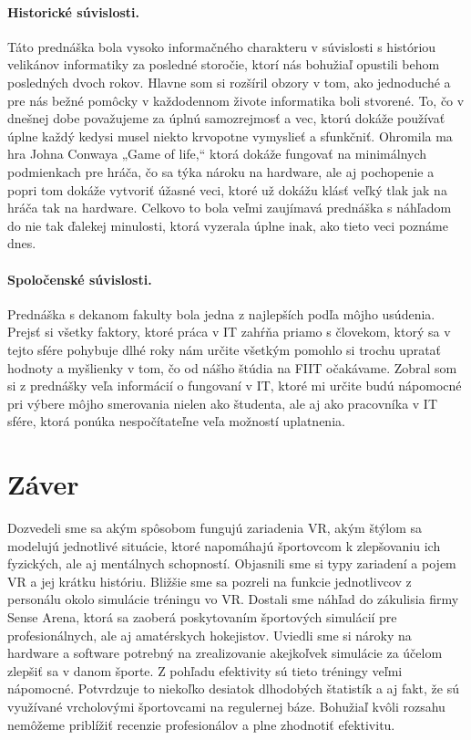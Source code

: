 \documentclass[10pt,twoside,slovak,a4paper]{article}										%
\begin{document}
\paragraph{Historické súvislosti.} 
Táto prednáška bola vysoko informačného charakteru v súvislosti s históriou velikánov informatiky za posledné storočie, ktorí nás bohužiaľ opustili behom posledných dvoch rokov. Hlavne som si rozšíril obzory v tom, ako jednoduché a pre nás bežné pomôcky v každodennom živote informatika boli stvorené. To, čo v dnešnej dobe považujeme za úplnú samozrejmosť a vec, ktorú dokáže používať úplne každý kedysi musel niekto krvopotne vymyslieť a sfunkčniť. Ohromila ma hra Johna Conwaya „Game of life,“ ktorá dokáže fungovať na minimálnych podmienkach pre hráča, čo sa týka nároku na hardware, ale aj pochopenie a popri tom dokáže vytvoriť úžasné veci, ktoré už dokážu klásť veľký tlak jak na hráča tak na hardware. Celkovo to bola veľmi zaujímavá prednáška s náhľadom do nie tak ďalekej minulosti, ktorá vyzerala úplne inak, ako tieto veci poznáme dnes. ~\cite{sedem:zdroj}

\paragraph{Spoločenské súvislosti.} 
Prednáška s dekanom fakulty bola jedna z najlepších podľa môjho usúdenia. Prejsť si všetky faktory, ktoré práca v IT zahŕňa priamo s človekom, ktorý sa v tejto sfére pohybuje dlhé roky nám určite všetkým pomohlo si trochu upratať hodnoty a myšlienky v tom, čo od nášho štúdia na FIIT očakávame. Zobral som si z prednášky veľa informácií o fungovaní v IT, ktoré mi určite budú nápomocné pri výbere môjho smerovania nielen ako študenta, ale aj ako pracovníka v IT sfére, ktorá ponúka nespočítateľne veľa možností uplatnenia.~\cite{naco:zdroj}

\section{Záver} \label{zaver}
Dozvedeli sme sa akým spôsobom fungujú zariadenia VR, akým štýlom sa modelujú jednotlivé situácie, ktoré napomáhajú športovcom k zlepšovaniu ich fyzických, ale aj mentálnych schopností. Objasnili sme si typy zariadení a pojem VR a jej krátku históriu. Bližšie sme sa pozreli na funkcie jednotlivcov z personálu okolo simulácie tréningu vo VR. Dostali sme náhľad do zákulisia firmy Sense Arena, ktorá sa zaoberá poskytovaním športových simulácií pre profesionálnych, ale aj amatérskych hokejistov. Uviedli sme si nároky na hardware a software potrebný na zrealizovanie akejkoľvek simulácie za účelom zlepšiť sa v danom športe. Z pohľadu efektivity sú tieto tréningy veľmi nápomocné. Potvrdzuje to niekoľko desiatok dlhodobých štatistík a aj fakt, že sú využívané vrcholovými športovcami na regulernej báze. Bohužiaľ kvôli rozsahu nemôžeme priblížiť recenzie profesionálov a plne zhodnotiť efektivitu.

 
\end{document}

